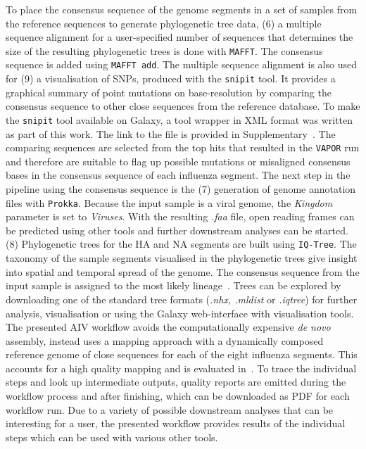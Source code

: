 To place the consensus sequence of the genome segments in a set of samples from the reference sequences to generate phylogenetic tree data, (6) a multiple sequence alignment for a user-specified number of sequences that determines the size of the resulting phylogenetic trees is done with \texttt{\acs{MAFFT}}. The consensus sequence is added using \texttt{\acs{MAFFT} add}. The multiple sequence alignment is also used for (9) a visualisation of SNPs, produced with the \texttt{snipit} tool. It provides a graphical summary of point mutations on base-resolution by comparing the consensus sequence to other close sequences from the reference database. To make the \texttt{snipit} tool available on Galaxy, a tool wrapper in XML format was written as part of this work. The link to the file is provided in Supplementary~. The comparing sequences are selected from the top hits that resulted in the \texttt{VAPOR} run and therefore are suitable to flag up possible mutations or misaligned consensus bases in the consensus sequence of each influenza segment. The next step in the pipeline using the consensus sequence is the (7) generation of genome annotation files with \texttt{Prokka}. Because the input sample is a viral genome, the \textit{Kingdom} parameter is set to \textit{Viruses}. With the resulting \textit{.faa} file, open reading frames can be predicted using other tools and further downstream analyses can be started. (8) Phylogenetic trees for the \ac{HA} and \ac{NA} segments are built using \texttt{IQ-Tree}. The taxonomy of the sample segments visualised in the phylogenetic trees give insight into spatial and temporal spread of the genome. The consensus sequence from the input sample is assigned to the most likely lineage~\cite{minh2020iq}. Trees can be explored by downloading one of the standard tree formats (\textit{.nhx, .mldist} or \textit{.iqtree}) for further analysis, visualisation or using the Galaxy web-interface with visualisation tools. \\
The presented \ac{AIV} workflow avoids the computationally expensive \textit{de novo} assembly, instead uses a mapping approach with a dynamically composed reference genome of close sequences for each of the eight influenza segments. This accounts for a high quality mapping and is evaluated in~. To trace the individual steps and look up intermediate outputs, quality reports are emitted during the workflow process and after finishing, which can be downloaded as PDF for each workflow run. Due to a variety of possible downstream analyses that can be interesting for a user, the presented workflow provides results of the individual steps which can be used with various other tools.

